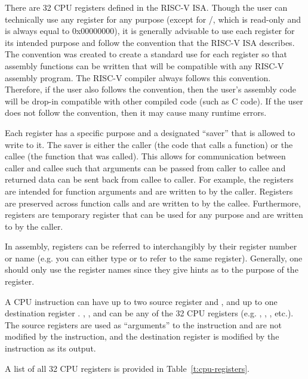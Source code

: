 \documentclass[11pt,pdftex,portrait,letterpaper]{article}
\begin{document}
There are 32 CPU registers defined in the RISC-V ISA. Though the user can technically use any register for any purpose (except for /, which is read-only and is always equal to 0x00000000), it is generally advisable to use each register for its intended purpose and follow the convention that the RISC-V ISA describes. The convention was created to create a standard use for each register so that assembly functions can be written that will be compatible with any RISC-V assembly program. The RISC-V compiler always follows this convention. Therefore, if the user also follows the convention, then the user's assembly code will be drop-in compatible with other compiled code (such as C code). If the user does not follow the convention, then it may cause many runtime errors.

Each register has a specific purpose and a designated ``saver'' that is allowed to write to it. The saver is either the caller (the code that calls a function) or the callee (the function that was called). This allows for communication between caller and callee such that arguments can be passed from caller to callee and returned data can be sent back from callee to caller. For example, the registers  are intended for function arguments and are written to by the caller. Registers  are preserved across function calls and are written to by the callee. Furthermore, registers  are temporary register that can be used for any purpose and are written to by the caller.

In assembly, registers can be referred to interchangibly by their register number or name (e.g. you can either type  or  to refer to the same register). Generally, one should only use the register names since they give hints as to the purpose of the register.

A CPU instruction can have up to two source register  and , and up to one destination register . , , and  can be any of the 32 CPU registers (e.g. , , , etc.). The source registers are used as ``arguments'' to the instruction and are not modified by the instruction, and the destination register is modified by the instruction as its output. 

A list of all 32 CPU registers is provided in Table~\ref{t:cpu-registers}.
\end{document}
